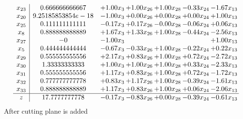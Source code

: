 \documentclass[8pt]{article}
\begin{document}
\[\begin{array}{c| c c@{\hskip 2pt} c@{\hskip 2pt} c@{\hskip 2pt} c@{\hskip 2pt} c@{\hskip 2pt} }
 x_{23}   &  0.666666666667 & +  1.00 x_{3} & +  1.00 x_{26} & +  1.00 x_{28} & -0.33 x_{24} & -1.67 x_{13}\\
 x_{20}   &  9.25185853854e-18 & -1.00 x_{3} & +  0.00 x_{26} & +  0.00 x_{28} & +  0.00 x_{24} & +  1.00 x_{13}\\
 x_{25}   &  0.111111111111 & -0.17 x_{3} & +  0.17 x_{26} & -0.00 x_{28} & -0.06 x_{24} & +  0.06 x_{13}\\
 x_{8}   &  0.888888888889 & +  1.67 x_{3} & +  1.33 x_{26} & +  1.00 x_{28} & -0.44 x_{24} & -2.56 x_{13}\\
 x_{27}   &  -0 & -1.00 x_{3} &    &    &   & +  1.00 x_{13}\\
 x_{5}   &  0.444444444444 & -0.67 x_{3} & -0.33 x_{26} & +  1.00 x_{28} & -0.22 x_{24} & +  0.22 x_{13}\\
 x_{29}   &  0.555555555556 & +  2.17 x_{3} & +  0.83 x_{26} & +  1.00 x_{28} & +  0.72 x_{24} & -2.72 x_{13}\\
 x_{30}   &  1.33333333333 & +  1.00 x_{3} & +  1.00 x_{26} & +  1.00 x_{28} & +  0.33 x_{24} & -2.33 x_{13}\\
 x_{31}   &  0.555555555556 & +  1.17 x_{3} & +  0.83 x_{26} & +  1.00 x_{28} & +  0.72 x_{24} & -1.72 x_{13}\\
 x_{32}   &  0.777777777778 & +  0.83 x_{3} & +  1.17 x_{26} & +  1.00 x_{28} & -0.39 x_{24} & -1.61 x_{13}\\
 x_{33}   &  0.888888888889 & +  1.17 x_{3} & +  0.83 x_{26} & +  1.00 x_{28} & +  0.06 x_{24} & -2.06 x_{13}\\
\hline
z    &  17.7777777778 & -0.17 x_{3} & -0.83 x_{26} & +  0.00 x_{28} & -0.39 x_{24} & -0.61 x_{13}\\
\end{array}\]
 After cutting plane is added 
\end{document}
